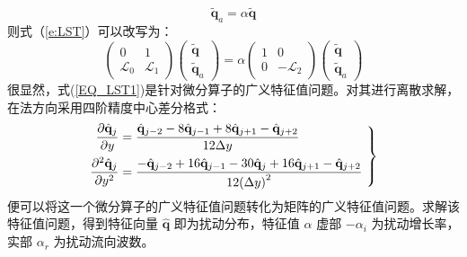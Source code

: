 \begin{equation}
  \tilde{\mathbf{q}}_a = \alpha\tilde{\mathbf{q}}
\end{equation}
则式（\ref{e:LST}）可以改写为：
\begin{equation}
  \left(
  \begin{array}{cc}
    0 & 1 \\
    \mathscr{L}_0 & \mathscr{L}_1
  \end{array}
  \right)
  \left(
  \begin{array}{c}
    \tilde{\mathbf{q}} \\
    \tilde{\mathbf{q}}_a
  \end{array}
  \right)
  =\alpha
  \left(
  \begin{array}{cc}
    1 & 0 \\
    0 & -\mathscr{L}_2
  \end{array}
  \right)
  \left(
  \begin{array}{c}
    \tilde{\mathbf{q}} \\
    \tilde{\mathbf{q}}_a
  \end{array}
  \right)
\end{equation}
很显然，式(\ref{EQ_LST1})是针对微分算子的广义特征值问题。对其进行离散求解，在法方向采用四阶精度中心差分格式：
\begin{equation}\label{EQ_CF}\left.
\begin{aligned}
    \frac{\partial{\hat{\mathbf{q}}_j}}{\partial y} &= \frac{{
    {\hat{\mathbf{q}}_{j - 2}}
    - 8{\hat{\mathbf{q}}_{j - 1}}
    + 8{\hat{\mathbf{q}}_{j + 1}}
    - {\hat{\mathbf{q}}_{j + 2}}}}{{12\Delta y}}\\
    \frac{{{\partial ^2}{\hat{\mathbf{q}}_j}}}{{\partial {y^2}}} &= \frac{{
    - {\hat{\mathbf{q}}_{j - 2}}
    + 16{\hat{\mathbf{q}}_{j - 1}}
    - 30{\hat{\mathbf{q}}_j}
    + 16{\hat{\mathbf{q}}_{j + 1}}
    - {\hat{\mathbf{q}}_{j + 2}}}}{{12{{\left( {\Delta y} \right)}^2}}}
\end{aligned}~\right\}
\end{equation}
便可以将这一个微分算子的广义特征值问题转化为矩阵的广义特征值问题。求解该特征值问题，得到特征向量 $\hat{\mathbf{q}}$ 即为扰动分布，特征值 $\alpha$ 虚部 $-\alpha_i$ 为扰动增长率，实部 $\alpha_r$ 为扰动流向波数。


